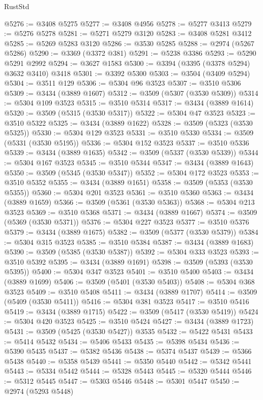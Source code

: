\begin{lexlean}{RustStd}
\begin{coremodule}
@5276 := @3408 @5275
@5277 := @3408 @4956
@5278 := @5277 @3413
@5279 := @5276 @5278
@5281 := @5271 @5279 @3120
@5283 := @3408 @5281 @3412
@5285 := @5269 @5283 @3120
@5286 := @3530 @5285
@5288 := @2974 (@5267 @5286)
@5290 := @3369 (@3372 @381)
@5291 := @5238 @3386
@5293 := @5290 @5291 @2992
@5294 := @3627 @1583
@5300 := @3394 (@3395 (@3378 @5294) @3632 @3410) @3418
@5301 := @3392 @5300
@5303 := @3504 (@3409 @5294)
@5304 := @3511 @129
@5306 := @5304 @96 @3523
@5307 := @3510 @5306
@5309 := @3434 (@3889 @1607)
@5312 := @3509 (@5307 (@3530 @5309))
@5314 := @5304 @109 @3523
@5315 := @3510 @5314
@5317 := @3434 (@3889 @1614)
@5320 := @3509 (@5315 (@3530 @5317))
@5322 := @5304 @47 @3523
@5323 := @3510 @5322
@5325 := @3434 (@3889 @1622)
@5328 := @3509 (@5323 (@3530 @5325))
@5330 := @5304 @129 @3523
@5331 := @3510 @5330
@5334 := @3509 (@5331 (@3530 @5195))
@5336 := @5304 @152 @3523
@5337 := @3510 @5336
@5339 := @3434 (@3889 @1635)
@5342 := @3509 (@5337 (@3530 @5339))
@5344 := @5304 @167 @3523
@5345 := @3510 @5344
@5347 := @3434 (@3889 @1643)
@5350 := @3509 (@5345 (@3530 @5347))
@5352 := @5304 @172 @3523
@5353 := @3510 @5352
@5355 := @3434 (@3889 @1651)
@5358 := @3509 (@5353 (@3530 @5355))
@5360 := @5304 @201 @3523
@5361 := @3510 @5360
@5363 := @3434 (@3889 @1659)
@5366 := @3509 (@5361 (@3530 @5363))
@5368 := @5304 @213 @3523
@5369 := @3510 @5368
@5371 := @3434 (@3889 @1667)
@5374 := @3509 (@5369 (@3530 @5371))
@5376 := @5304 @227 @3523
@5377 := @3510 @5376
@5379 := @3434 (@3889 @1675)
@5382 := @3509 (@5377 (@3530 @5379))
@5384 := @5304 @315 @3523
@5385 := @3510 @5384
@5387 := @3434 (@3889 @1683)
@5390 := @3509 (@5385 (@3530 @5387))
@5392 := @5304 @333 @3523
@5393 := @3510 @5392
@5395 := @3434 (@3889 @1691)
@5398 := @3509 (@5393 (@3530 @5395))
@5400 := @5304 @347 @3523
@5401 := @3510 @5400
@5403 := @3434 (@3889 @1699)
@5406 := @3509 (@5401 (@3530 @5403))
@5408 := @5304 @368 @3523
@5409 := @3510 @5408
@5411 := @3434 (@3889 @1707)
@5414 := @3509 (@5409 (@3530 @5411))
@5416 := @5304 @381 @3523
@5417 := @3510 @5416
@5419 := @3434 (@3889 @1715)
@5422 := @3509 (@5417 (@3530 @5419))
@5424 := @5304 @420 @3523
@5425 := @3510 @5424
@5427 := @3434 (@3889 @1723)
@5431 := @3509 (@5425 (@3530 @5427)) @3535
@5432 := @5422 @5431
@5433 := @5414 @5432
@5434 := @5406 @5433
@5435 := @5398 @5434
@5436 := @5390 @5435
@5437 := @5382 @5436
@5438 := @5374 @5437
@5439 := @5366 @5438
@5440 := @5358 @5439
@5441 := @5350 @5440
@5442 := @5342 @5441
@5443 := @5334 @5442
@5444 := @5328 @5443
@5445 := @5320 @5444
@5446 := @5312 @5445
@5447 := @5303 @5446
@5448 := @5301 @5447
@5450 := @2974 (@5293 @5448)

\end{coremodule}
\end{lexlean}
